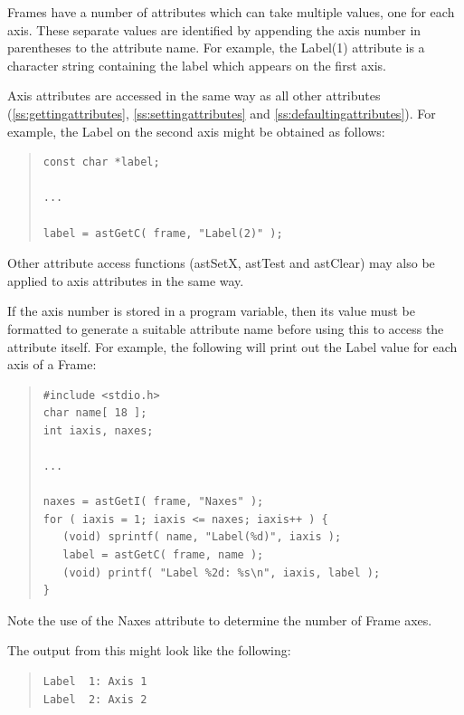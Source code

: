 \documentclass[twoside,11pt]{article}
\newcommand{\htmlref}[2]{#1}
\newcommand{\secref}[1]{\S\ref{#1}}
\renewcommand{\secref}[1]{\ref{#1}}
\begin{document}
Frames have a number of attributes which can take multiple values, one
for each axis. These separate values are identified by appending the
axis number in parentheses to the attribute name. For example, the
Label(1) attribute is a character string containing the label which
appears on the first axis.

\htmlref{Axis}{Axis} attributes are accessed in the same way as all other attributes
(\secref{ss:gettingattributes}, \secref{ss:settingattributes} and
\secref{ss:defaultingattributes}). For example, the Label on the second
axis might be obtained as follows:

\begin{quote}
\small
\begin{verbatim}
const char *label;

...

label = astGetC( frame, "Label(2)" );
\end{verbatim}
\normalsize
\end{quote}

Other attribute access functions (astSetX, \htmlref{astTest}{astTest} and \htmlref{astClear}{astClear}) may
also be applied to axis attributes in the same way.

If the axis number is stored in a program variable, then its value
must be formatted to generate a suitable attribute name before using
this to access the attribute itself. For example, the following will
print out the Label value for each axis of a \htmlref{Frame}{Frame}:

\begin{quote}
\small
\begin{verbatim}
#include <stdio.h>
char name[ 18 ];
int iaxis, naxes;

...

naxes = astGetI( frame, "Naxes" );
for ( iaxis = 1; iaxis <= naxes; iaxis++ ) {
   (void) sprintf( name, "Label(%d)", iaxis );
   label = astGetC( frame, name );
   (void) printf( "Label %2d: %s\n", iaxis, label );
}
\end{verbatim}
\normalsize
\end{quote}

Note the use of the \htmlref{Naxes}{Naxes} attribute to determine the number of Frame
axes.

The output from this might look like the following:

\begin{quote}
\begin{verbatim}
Label  1: Axis 1
Label  2: Axis 2
\end{verbatim}
\end{quote}
\end{document}
